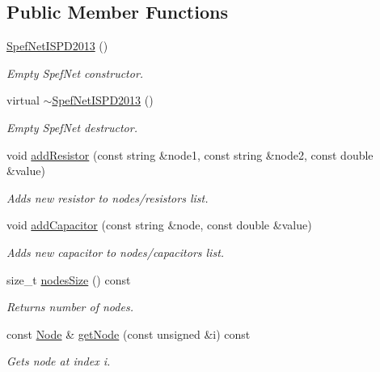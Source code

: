 \subsection*{Public Member Functions}
\begin{DoxyCompactItemize}
\item 
\hyperlink{classSpefNetISPD2013_a41ab1d666a3724e63e0fd815765f1372}{Spef\-Net\-I\-S\-P\-D2013} ()
\begin{DoxyCompactList}\small\item\em Empty Spef\-Net constructor. \end{DoxyCompactList}\item 
virtual \hyperlink{classSpefNetISPD2013_a6bd1c7cc6d7bdf677fb69bb577a6327f}{$\sim$\-Spef\-Net\-I\-S\-P\-D2013} ()
\begin{DoxyCompactList}\small\item\em Empty Spef\-Net destructor. \end{DoxyCompactList}\item 
void \hyperlink{classSpefNetISPD2013_ac837ca5049dd0fc8301b1c51a8508bfd}{add\-Resistor} (const string \&node1, const string \&node2, const double \&value)
\begin{DoxyCompactList}\small\item\em Adds new resistor to nodes/resistors list. \end{DoxyCompactList}\item 
void \hyperlink{classSpefNetISPD2013_a9d5344541f303241af6bec439a692850}{add\-Capacitor} (const string \&node, const double \&value)
\begin{DoxyCompactList}\small\item\em Adds new capacitor to nodes/capacitors list. \end{DoxyCompactList}\item 
size\-\_\-t \hyperlink{classSpefNetISPD2013_a68ae22df2961b88537802d444dd20588}{nodes\-Size} () const 
\begin{DoxyCompactList}\small\item\em Returns number of nodes. \end{DoxyCompactList}\item 
const \hyperlink{structSpefNetISPD2013_1_1Node}{Node} \& \hyperlink{classSpefNetISPD2013_a8beeae8a280358ba32eedab9367b1006}{get\-Node} (const unsigned \&i) const 
\begin{DoxyCompactList}\small\item\em Gets node at index i. \end{DoxyCompactList}\item 

\end{DoxyCompactItemize}
